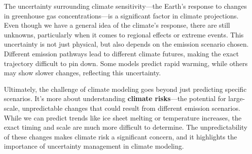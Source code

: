 The uncertainty surrounding climate sensitivity—the Earth's response to changes in greenhouse gas concentrations—is a significant factor in climate projections. Even though we have a general idea of the climate's response, there are still unknowns, particularly when it comes to regional effects or extreme events. This uncertainty is not just physical, but also depends on the emission scenario chosen. Different emission pathways lead to different climate futures, making the exact trajectory difficult to pin down. Some models predict rapid warming, while others may show slower changes, reflecting this uncertainty.



Ultimately, the challenge of climate modeling goes beyond just predicting specific scenarios. It's more about understanding \textbf{climate risks}—the potential for large-scale, unpredictable changes that could result from different emission scenarios. While we can predict trends like ice sheet melting or temperature increases, the exact timing and scale are much more difficult to determine. The unpredictability of these changes makes climate risk a significant concern, and it highlights the importance of uncertainty management in climate modeling.



